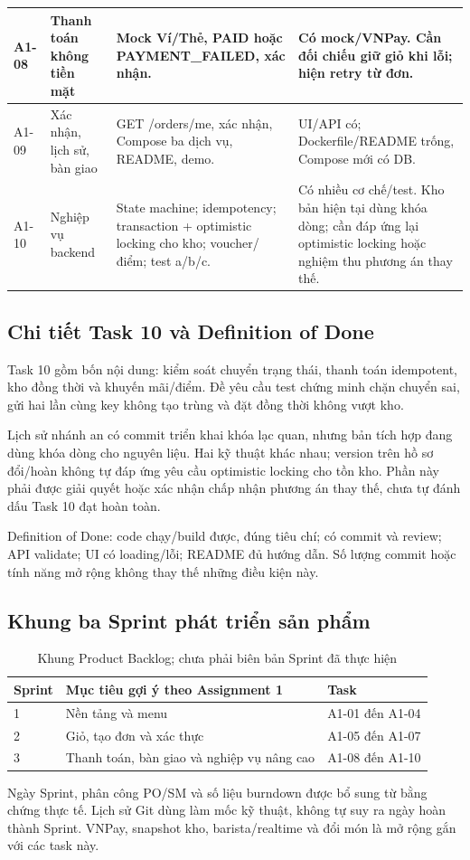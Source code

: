 \begin{longtable}{|>{\raggedright\arraybackslash}p{}|>{\raggedright\arraybackslash}p{}|>{\raggedright\arraybackslash}p{}|>{\raggedright\arraybackslash}p{}|}
A1-08 & Thanh toán không tiền mặt & Mock Ví/Thẻ, PAID hoặc PAYMENT\_FAILED, xác nhận. & Có mock/VNPay. Cần đối chiếu giữ giỏ khi lỗi; hiện retry từ đơn.\\\hline
A1-09 & Xác nhận, lịch sử, bàn giao & GET /orders/me, xác nhận, Compose ba dịch vụ, README, demo. & UI/API có; Dockerfile/README trống, Compose mới có DB.\\\hline
A1-10 & Nghiệp vụ backend & State machine; idempotency; transaction + optimistic locking cho kho; voucher/điểm; test a/b/c. & Có nhiều cơ chế/test. Kho bản hiện tại dùng khóa dòng; cần đáp ứng lại optimistic locking hoặc nghiệm thu phương án thay thế.\\\hline
\end{longtable}\endgroup

\subsection{Chi tiết Task 10 và Definition of Done}
Task 10 gồm bốn nội dung: kiểm soát chuyển trạng thái, thanh toán idempotent, kho đồng thời và khuyến mãi/điểm. Đề yêu cầu test chứng minh chặn chuyển sai, gửi hai lần cùng key không tạo trùng và đặt đồng thời không vượt kho.

Lịch sử nhánh an có commit triển khai khóa lạc quan, nhưng bản tích hợp đang dùng khóa dòng cho nguyên liệu. Hai kỹ thuật khác nhau; version trên hồ sơ đổi/hoàn không tự đáp ứng yêu cầu optimistic locking cho tồn kho. Phần này phải được giải quyết hoặc xác nhận chấp nhận phương án thay thế, chưa tự đánh dấu Task 10 đạt hoàn toàn.

Definition of Done: code chạy/build được, đúng tiêu chí; có commit và review; API validate; UI có loading/lỗi; README đủ hướng dẫn. Số lượng commit hoặc tính năng mở rộng không thay thế những điều kiện này.

\subsection{Khung ba Sprint phát triển sản phẩm}
\begin{table}[htbp]\centering\small
\begin{tabularx}{\textwidth}{|l|X|l|}\hline
\textbf{Sprint} & \textbf{Mục tiêu gợi ý theo Assignment 1} & \textbf{Task}\\\hline
1 & Nền tảng và menu & A1-01 đến A1-04\\\hline
2 & Giỏ, tạo đơn và xác thực & A1-05 đến A1-07\\\hline
3 & Thanh toán, bàn giao và nghiệp vụ nâng cao & A1-08 đến A1-10\\\hline
\end{tabularx}\caption{Khung Product Backlog; chưa phải biên bản Sprint đã thực hiện}
\end{table}
Ngày Sprint, phân công PO/SM và số liệu burndown được bổ sung từ bằng chứng thực tế. Lịch sử Git dùng làm mốc kỹ thuật, không tự suy ra ngày hoàn thành Sprint. VNPay, snapshot kho, barista/realtime và đổi món là mở rộng gắn với các task này.
